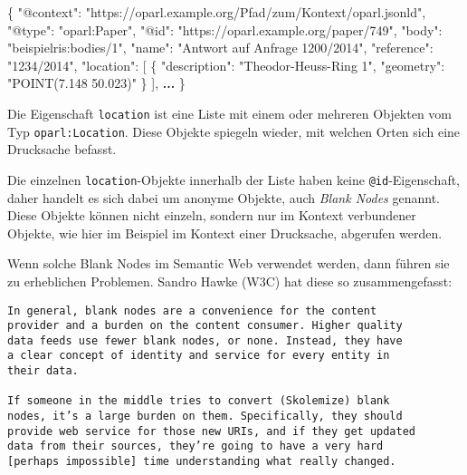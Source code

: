 \documentclass[,a4paper]{article}
\newenvironment{Shaded}{}{}
\newcommand{\DataTypeTok}[1]{\textcolor[rgb]{0.56,0.13,0.00}{{#1}}}
\newcommand{\StringTok}[1]{\textcolor[rgb]{0.25,0.44,0.63}{{#1}}}
\newcommand{\OtherTok}[1]{\textcolor[rgb]{0.00,0.44,0.13}{{#1}}}
\newcommand{\FunctionTok}[1]{\textcolor[rgb]{0.02,0.16,0.49}{{#1}}}
\newcommand{\ErrorTok}[1]{\textcolor[rgb]{1.00,0.00,0.00}{\textbf{{#1}}}}
\begin{document}
\begin{Shaded}
\begin{Highlighting}[]
\FunctionTok{\{}
    \DataTypeTok{"@context"}\FunctionTok{:} \StringTok{"https://oparl.example.org/Pfad/zum/Kontext/oparl.jsonld"}\FunctionTok{,}
    \DataTypeTok{"@type"}\FunctionTok{:} \StringTok{"oparl:Paper"}\FunctionTok{,}
    \DataTypeTok{"@id"}\FunctionTok{:} \StringTok{"https://oparl.example.org/paper/749"}\FunctionTok{,}
    \DataTypeTok{"body"}\FunctionTok{:} \StringTok{"beispielris:bodies/1"}\FunctionTok{,}
    \DataTypeTok{"name"}\FunctionTok{:} \StringTok{"Antwort auf Anfrage 1200/2014"}\FunctionTok{,}
    \DataTypeTok{"reference"}\FunctionTok{:} \StringTok{"1234/2014"}\FunctionTok{,}
    \DataTypeTok{"location"}\FunctionTok{:} \OtherTok{[}
        \FunctionTok{\{}
            \DataTypeTok{"description"}\FunctionTok{:} \StringTok{"Theodor-Heuss-Ring 1"}\FunctionTok{,}
            \DataTypeTok{"geometry"}\FunctionTok{:} \StringTok{"POINT(7.148  50.023)"}
        \FunctionTok{\}}
    \OtherTok{]}\FunctionTok{,}
    \ErrorTok{...}
\FunctionTok{\}}
\end{Highlighting}
\end{Shaded}

Die Eigenschaft \texttt{location} ist eine Liste mit einem oder mehreren
Objekten vom Typ \texttt{oparl:Location}. Diese Objekte spiegeln wieder,
mit welchen Orten sich eine Drucksache befasst.

Die einzelnen \texttt{location}-Objekte innerhalb der Liste haben keine
\texttt{@id}-Eigenschaft, daher handelt es sich dabei um anonyme
Objekte, auch \emph{Blank Nodes} genannt. Diese Objekte können nicht
einzeln, sondern nur im Kontext verbundener Objekte, wie hier im
Beispiel im Kontext einer Drucksache, abgerufen werden.

Wenn solche Blank Nodes im Semantic Web verwendet werden, dann führen
sie zu erheblichen Problemen. Sandro Hawke (W3C) hat diese so
zusammengefasst:

\begin{verbatim}
In general, blank nodes are a convenience for the content
provider and a burden on the content consumer. Higher quality
data feeds use fewer blank nodes, or none. Instead, they have
a clear concept of identity and service for every entity in 
their data.

If someone in the middle tries to convert (Skolemize) blank 
nodes, it’s a large burden on them. Specifically, they should
provide web service for those new URIs, and if they get updated
data from their sources, they’re going to have a very hard
[perhaps impossible] time understanding what really changed.
\end{verbatim}
\end{document}
